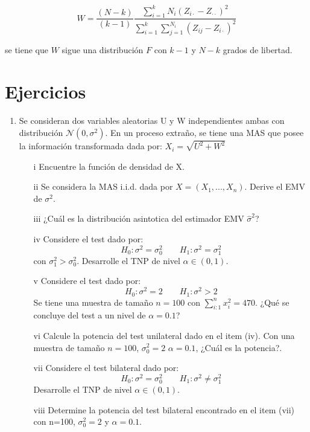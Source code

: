 \[W=\dfrac{(N-k)}{(k-1)}\dfrac{\sum\limits_{i=1}^{k}N_i(Z_{i\cdot}-Z_{\cdot\cdot})^2}{\sum\limits_{i=1}^{k}\sum\limits_{j=1}^{N_i}(Z_{ij}-Z_{i\cdot})^2}\]

se tiene que $W$ sigue una distribución $F$ con $k-1$ y $N-k$ grados de libertad. 

 
 \section{Ejercicios}
 
 \begin{enumerate}
     \item Se consideran dos variables aleatorias U y W independientes ambas con distribución $\mathcal{N}(0,\sigma^2)$. En un proceso extraño, se tiene una MAS que posee la información transformada dada por: $X_i=\sqrt{U^2+W^2}$

\begin{enumerate}
    \item[i] Encuentre la función de densidad de X.
    
    \item[ii] Se considera la MAS i.i.d. dada por $X=(X_1,...,X_n)$. Derive el EMV de $\sigma^2$.
    
    \item[iii]¿Cuál es la distribución asintotica del estimador EMV $\hat{\sigma}^2$?
    
    \item[iv] Considere el test dado por:
    \[ H_0: \sigma^2=\sigma^2_0 \qquad H_1:\sigma^2=\sigma^2_1 \]
    con $\sigma^2_1>\sigma^2_0$. Desarrolle el TNP de nivel $\alpha\in(0,1)$.
    
    \item[v] Considere el test dado por:
    \[ H_0: \sigma^2=2 \qquad H_1:\sigma^2>2 \]
    Se tiene una muestra de tamaño $n=100$ con $\sum\limits_{i:1}^n x_i^2=470$. ¿Qué se concluye del test a un nivel de $\alpha=0.1$?
    
    \item[vi] Calcule la potencia del test unilateral dado en el item (iv). Con una muestra de tamaño $n=100$, $\sigma^2_0=2$ $\alpha=0.1$, ¿Cuál es la potencia?.
    
    \item[vii] Considere el test bilateral dado por:
    \[ H_0: \sigma^2=\sigma^2_0 \qquad H_1:\sigma^2\neq\sigma^2_1 \]
    Desarrolle el TNP de nivel $\alpha\in(0,1)$.
    
    \item[viii] Determine la potencia del test bilateral encontrado en el item (vii) con n=100, $\sigma^2_0=2$ y $\alpha=0.1$.
    

\end{enumerate}
\end{enumerate}
